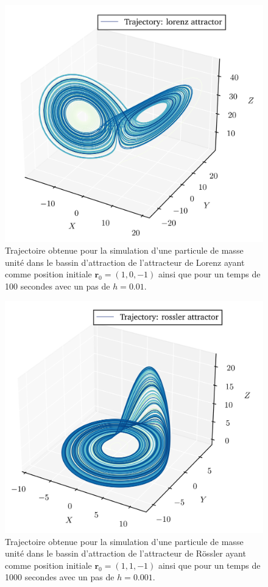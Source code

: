     \begin{figure}[h!]
        \centering
        \includegraphics[scale=0.6]{figs/trajectories/traj_lorenz.png}
        \caption{Trajectoire obtenue pour la simulation d'une particule de masse unité dans le bassin d'attraction de l'attracteur de Lorenz ayant comme position initiale $\bm{r}_0 = (1, 0, -1)$ ainsi que pour un temps de 100 secondes avec un pas de $h = 0.01$.}
        \label{fig: traj_lorenz}
    \end{figure}
    \vspace{1cm}
    \begin{figure}[h!]
        \centering
        \includegraphics[scale=0.6]{figs/trajectories/traj_rossler.png}
        \caption{Trajectoire obtenue pour la simulation d'une particule de masse unité dans le bassin d'attraction de l'attracteur de Rössler ayant comme position initiale $\bm{r}_0 = (1, 1, -1)$ ainsi que pour un temps de 1000 secondes avec un pas de $h = 0.001$.}
        \label{fig: traj_rossler}
    \end{figure}

